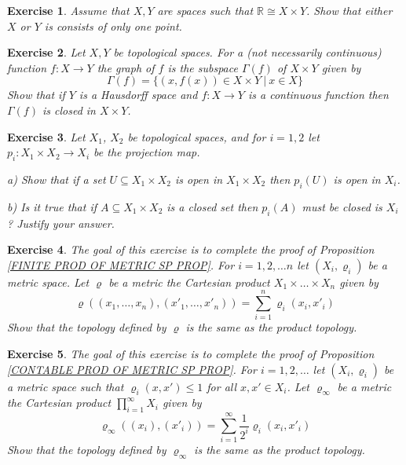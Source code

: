 \documentclass[11pt, letterpaper, oneside]{report}
\theoremstyle{pplain}
\newtheorem{ITERMVALUE THM}[theorem]{Intermediate Value Theorem}
\newtheorem{HEINEBOREL THM}[theorem]{Heine-Borel Theorem}
\newtheorem{UMETR THM}[theorem]{Urysohn Metrization Theorem}
\newtheorem{UMETR2 THM}[theorem]{Urysohn Metrization Theorem (v.2)}
\theoremstyle{ddefinition}
\theoremstyle{nnn}
\newtheorem{TDA NN}[theorem]{Topological Data Analysis. }
\theoremstyle{eexercise}
\newtheorem{exercise}{Exercise}[chapter]
\newcommand{\R}{{\mathbb R}}
\begin{document}
\begin{exercise}
Assume that $X, Y$ are spaces such that  $\R \cong X\times Y$. Show that either $X$ or
$Y$ is consists of only one point.  
\end{exercise}





\begin{exercise}
\label{CLOSED GRAPH EXERCISE}
Let $X, Y$ be topological spaces. For a (not necessarily continuous) function $f\colon X \to Y$ 
the \emph{graph} of $f$ is the subspace 
$\Gamma(f)$ of $X\times Y$ given by 
$$\Gamma(f) = \{ (x, f(x)) \in X\times Y \ | \ x\in X \}$$
Show that if $Y$ is a Hausdorff space and $f\colon X\to Y$ is a continuous function 
then $\Gamma(f)$ is closed in $X\times Y$. 
\end{exercise}





\begin{exercise}
Let $X_{1}$,  $X_{2}$ be topological spaces, and for $i=1, 2$ let $p_{i}\colon X_{1}\times X_{2} \to X_{i}$
be the projection map. 

a) Show that if a set $U \subseteq X_{1}\times X_{2}$ is open in $X_{1}\times X_{2}$
then $p_{i}(U)$ is open in $X_{i}$. 

b) Is it true that  if $A\subseteq X_{1}\times X_{2}$ is a  closed set then  $p_{i}(A)$ must be closed  is 
$X_{i}$ ? Justify your answer.  
\end{exercise}



\begin{exercise}
The goal of this exercise is to complete the proof of Proposition \ref{FINITE PROD OF METRIC SP PROP}. 
For $i = 1, 2, \dots n$ let $(X_{i}, \varrho_{i})$ be a metric space. Let $\varrho$ be a metric  the Cartesian 
product $X_{1}\times \dots \times X_{n}$ given by 
$$\varrho((x_{1}, \dots, x_{n}), (x'_{1}, \dots, x'_{n})) = \sum_{i=1}^{n} \varrho_{i}(x_{i}, x'_{i})$$
Show that the topology defined by $\varrho$ is the same as the product topology.
\end{exercise}

\begin{exercise}
The goal of this exercise is to complete the proof of Proposition \ref{CONTABLE PROD OF METRIC SP PROP}. 
For $i = 1, 2, \dots$ let $(X_{i}, \varrho_{i})$ be a metric space such that $\varrho_{i}(x, x') \leq 1$ for all 
$x, x'\in X_{i}$. Let $\varrho_{\infty}$ be a metric  the Cartesian product $\prod_{i=1}^{\infty} X_{i}$ given by 
$$\varrho_{\infty}((x_{i}), (x'_{i})) = \sum_{i=1}^{\infty} \frac{1}{2^{i}}\varrho_{i}(x_{i}, x'_{i})$$
Show that the topology defined by $\varrho_{\infty}$ is the same as the product topology.
\end{exercise}
\end{document}
